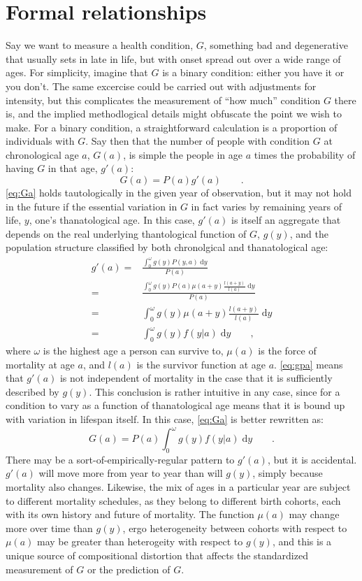 \documentclass[11pt,oneside,a4paper]{article} %
\newcommand{\dd}{\; \mathrm{d}}
\newcommand{\tc}{\quad\quad\text{,}}
\newcommand{\tp}{\quad\quad\text{.}}
\begin{document}
\section*{Formal relationships}
Say we want to measure a health condition, $G$, something bad and degenerative
that usually sets in late in life, but with onset spread out over a wide range
of ages. For simplicity, imagine that $G$ is a binary condition: either you have
it or you don't. The same excercise could be carried out with adjustments for
intensity, but this complicates the measurement of ``how much'' condition $G$
there is, and the implied methodlogical details might obfuscate the point we
wish to make. For a binary condition, a straightforward calculation is a
proportion of individuals with $G$. Say then that the number of people
with condition $G$ at chronological age $a$, $G(a)$, is simple the people in age
$a$ times the probability of having $G$ in that age, $g'(a)$:
\begin{equation}
\label{eq:Ga}
G(a) = P(a)  g'(a) \tp
\end{equation}
\eqref{eq:Ga} holds tautologically in the given year of observation, but it may
not hold in the future if the essential variation in $G$ in fact varies by
remaining years of life, $y$, one's thanatological age. In this case, $g'(a)$ is
itself an aggregate that depends on the real underlying thantological function
of $G$, $g(y)$, and the population structure classified by both chronolgical and
thanatological age:
\begin{align}
\label{eq:gpa}
g'(a) =& \frac{\int _0^\omega g(y)  P(y,a) \dd y}{P(a)} \\
  =& \frac{\int _0^\omega g(y)  P(a) \mu(a+y)\frac{l(a+y)}{l(a)}\dd y}{P(a)}\\
  =& \int _0^\omega g(y) \mu(a+y)\frac{l(a+y)}{l(a)}\dd y \\
  =& \int _0^\omega g(y) f(y|a)\dd y \tc
\end{align}
where $\omega$ is the highest age a person can survive to,
$\mu(a)$ is the force of mortality at age $a$, and $l(a)$ is the
survivor function at age $a$. \eqref{eq:gpa} means that $g'(a)$ is not
independent of mortality in the case that it is sufficiently described by
$g(y)$. This conclusion is rather intuitive in any case, since for a condition
to vary as a function of thanatological age means that it is bound up with
variation in lifespan itself. In this case, \eqref{eq:Ga} is better rewritten
as:
\begin{equation}
G(a) = P(a) \int _0^\omega g(y) f(y|a)\dd y \tp
\end{equation}
There may be a sort-of-empirically-regular pattern to $g'(a)$, but it is
accidental. $g'(a)$ will move more from year to year than will $g(y)$, simply
because mortality also changes. Likewise, the mix of ages in a
particular year are subject to different mortality schedules, as they belong to
different birth cohorts, each with its own history and future of mortality. The
function $\mu(a)$ may change more over time than $g(y)$, ergo heterogeneity
between cohorts with respect to $\mu(a)$ may be greater than heterogeity with
respect to $g(y)$, and this is a unique source of compositional distortion that
affects the standardized measurement of $G$ or the prediction of $G$.
\end{document}

